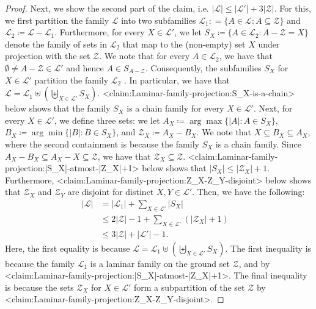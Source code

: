 \documentclass{article}
\def\Cref#1{<#1>}%
\newcommand{\knote}[1]{{\color{red}[{\tiny Karthik: \bf #1}]\marginpar{\color{red}*}}}
\providecommand{\calL}{\mathcal{L}}
\providecommand{\calZ}{\mathcal{Z}}
\begin{document}
\begin{proof}
    Next, we show the second part of the claim, i.e. $|\calL| \leq |\calL'| + 3|\calZ|$. For this, we first  partition the family $\calL$ into two subfamilies $\calL_1 : = \{A \in \calL : A \subseteq \calZ\}$ and $\calL_2 \coloneqq  \calL - \calL_1$. Furthermore, for every $X \in \calL'$, we let $S_X \coloneqq  \{A \in \calL_2 : A - \calZ = X\}$ denote the family of sets in $\calL_2$ that map to the (non-empty) set $X$ under projection with the set $\calZ$. 
    We note that for every $A \in \calL_2$, we have that $\emptyset \not = A - \calZ \in \calL'$ and hence $A \in S_{A - \calZ}$. Consequently, the subfamilies $S_X$ for $X \in \calL'$ partition the family $\calL_2$ 
    . In particular, we have that $\calL = \calL_1 \uplus \left(\biguplus_{X \in \calL'} S_X \right)$. \Cref{claim:Laminar-family-projection:S_X-is-a-chain} below shows that the family $S_X$ is a chain family for every $X \in \calL'$. Next, for every $X \in \calL'$, we define three sets: we let $A_X \coloneqq  \arg\max\{|A| : A \in S_X\}$, $B_{X} \coloneqq  \arg\min\{|B| : B \in S_X\}$, and $\calZ_X\coloneqq A_X-B_X$. 
    We note that $X \subseteq B_X \subseteq A_X$, where the second containment is because the family $S_X$ is a chain family. 
    Since $A_X - B_X \subseteq A_X - X \subseteq \calZ$, we have that $\calZ_X \subseteq \calZ$. \Cref{claim:Laminar-family-projection:|S_X|-atmost-|Z_X|+1} below shows that $|S_X| \leq |\calZ_X| + 1$. Furthermore, \Cref{claim:Laminar-family-projection:Z_X-Z_Y-disjoint} below shows that $\calZ_X$ and $\calZ_Y$ are disjoint for distinct $X,Y \in \calL'$. Then, we have the following:
\begin{align*}
        |\calL| & = |\calL_1| + \sum_{X \in \calL'} |S_X|&\\
        & \leq 2|\calZ| - 1 + \sum_{X \in \calL'}\left(|\calZ_X| + 1\right)&\\
        &\le 3|\calZ| + |\calL'|-1.&
    \end{align*}
    Here, the first equality is because $\calL = \calL_1 \uplus \left(\biguplus_{X \in \calL'} S_X \right)$. The first inequality is because the family $\calL_1$ is a laminar family on the ground set $\calZ$, and by \Cref{claim:Laminar-family-projection:|S_X|-atmost-|Z_X|+1}. The final inequality is because the sets $\calZ_X$ for $X \in\calL'$ form a subpartition of the set $\calZ$ by \Cref{claim:Laminar-family-projection:Z_X-Z_Y-disjoint}.
\end{proof}
\end{document}

